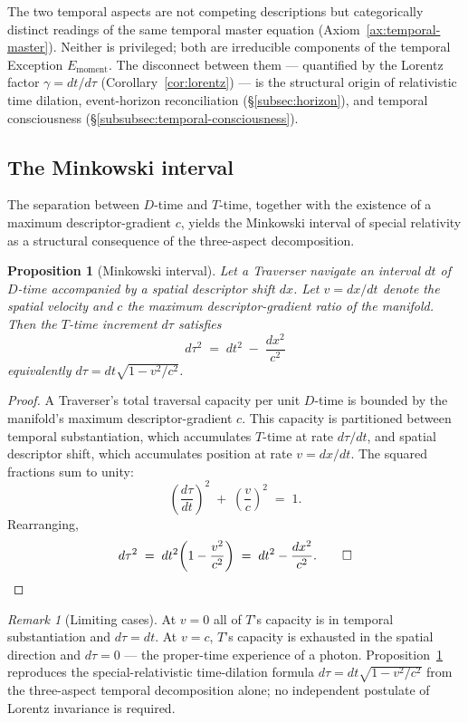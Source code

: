 \documentclass[11pt,a4paper]{article}
\newtheorem{proposition}[theorem]{Proposition}
\theoremstyle{definition}
\theoremstyle{remark}
\newtheorem{remark}[theorem]{Remark}
\begin{document}
The two temporal aspects are not competing descriptions but categorically distinct readings of the same temporal master equation (Axiom~\ref{ax:temporal-master}). Neither is privileged; both are irreducible components of the temporal Exception $E_{\text{moment}}$. The disconnect between them --- quantified by the Lorentz factor $\gamma = dt/d\tau$ (Corollary~\ref{cor:lorentz}) --- is the structural origin of relativistic time dilation, event-horizon reconciliation (\S\ref{subsec:horizon}), and temporal consciousness (\S\ref{subsubsec:temporal-consciousness}).

\subsection{The Minkowski interval}\label{subsec:minkowski}

The separation between $D$-time and $T$-time, together with the existence of a maximum descriptor-gradient $c$, yields the Minkowski interval of special relativity as a structural consequence of the three-aspect decomposition.

\begin{proposition}[Minkowski interval]\label{prop:minkowski}
Let a Traverser navigate an interval $dt$ of $D$-time accompanied by a spatial descriptor shift $dx$. Let $v = dx/dt$ denote the spatial velocity and $c$ the maximum descriptor-gradient ratio of the manifold. Then the $T$-time increment $d\tau$ satisfies
\[
\boxed{\;d\tau^{2} \;=\; dt^{2} \;-\; \frac{dx^{2}}{c^{2}}\;}
\]
equivalently $d\tau = dt\sqrt{1 - v^{2}/c^{2}}$.
\end{proposition}

\begin{proof}
A Traverser's total traversal capacity per unit $D$-time is bounded by the manifold's maximum descriptor-gradient $c$. This capacity is partitioned between temporal substantiation, which accumulates $T$-time at rate $d\tau/dt$, and spatial descriptor shift, which accumulates position at rate $v = dx/dt$. The squared fractions sum to unity:
\[
\left(\frac{d\tau}{dt}\right)^{\!2} \;+\; \left(\frac{v}{c}\right)^{\!2} \;=\; 1.
\]
Rearranging,
\[
d\tau^{2} \;=\; dt^{2}\!\left(1 - \frac{v^{2}}{c^{2}}\right) \;=\; dt^{2} - \frac{dx^{2}}{c^{2}}. \qed
\]
\end{proof}

\begin{remark}[Limiting cases]\label{rem:minkowski-limits}
At $v=0$ all of $T$'s capacity is in temporal substantiation and $d\tau = dt$. At $v=c$, $T$'s capacity is exhausted in the spatial direction and $d\tau = 0$ --- the proper-time experience of a photon. Proposition~\ref{prop:minkowski} reproduces the special-relativistic time-dilation formula $d\tau = dt\sqrt{1 - v^{2}/c^{2}}$ from the three-aspect temporal decomposition alone; no independent postulate of Lorentz invariance is required.
\end{remark}
\end{document}
